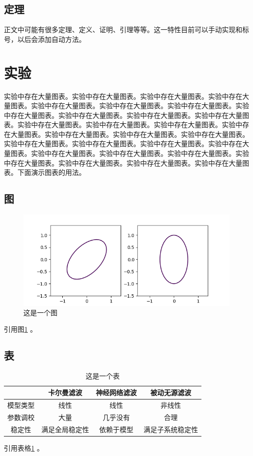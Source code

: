 \documentclass[12pt]{article} %
\begin{document}
\subsection{定理}
正文中可能有很多定理、定义、证明、引理等等。这一特性目前可以手动实现和标号，以后会添加自动方法。


\section{实验}
实验中存在大量图表。实验中存在大量图表。实验中存在大量图表。实验中存在大量图表。实验中存在大量图表。实验中存在大量图表。实验中存在大量图表。实验中存在大量图表。实验中存在大量图表。实验中存在大量图表。实验中存在大量图表。实验中存在大量图表。实验中存在大量图表。实验中存在大量图表。实验中存在大量图表。实验中存在大量图表。实验中存在大量图表。实验中存在大量图表。实验中存在大量图表。实验中存在大量图表。实验中存在大量图表。实验中存在大量图表。实验中存在大量图表。实验中存在大量图表。实验中存在大量图表。实验中存在大量图表。实验中存在大量图表。实验中存在大量图表。实验中存在大量图表。下面演示图表的用法。

\subsection{图}
\begin{figure}[ht]
\centering
\includegraphics[width=\textwidth]{canoform.png}
\caption{这是一个图}
\label{fig:fig1}
\end{figure}
引用图\ref{fig:fig1} 。

\subsection{表}
\begin{table}[ht]
\caption{这是一个表}
\label{tb:filter}
\centering
\begin{tabular}{cccc}
\hline
 & 卡尔曼滤波 & 神经网络滤波 & 被动无源滤波 \\ 
\hline
模型类型 & 线性 & 线性 & 非线性 \\ 
参数调校 & 大量 & 几乎没有 & 合理 \\ 
稳定性 & 满足全局稳定性 & 依赖于模型 & 满足子系统稳定性 \\ 
\hline
\end{tabular} 
\end{table}
引用表格\ref{tb:filter} 。
\end{document}
